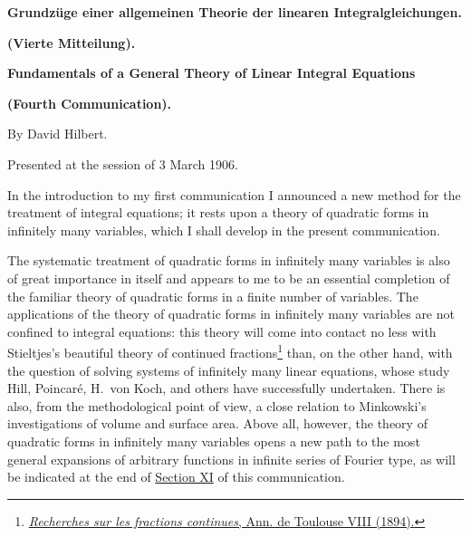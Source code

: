 \documentclass[b5paper,twoside]{article}
\newcommand{\originalpage}[1]{\phantomsection\label{origpage:#1}}
\begin{document}
\thispagestyle{empty}
\begin{center}
  {\LARGE\bfseries Grundz\"uge einer allgemeinen Theorie der linearen
  Integralgleichungen.\par}
  \vspace{0.35\baselineskip}
  {\Large\bfseries (Vierte Mitteilung).\par}
  \vspace{0.8\baselineskip}
  {\LARGE\bfseries Fundamentals of a General Theory of Linear Integral
  Equations\par}
  \vspace{0.35\baselineskip}
  {\Large\bfseries (Fourth Communication).\par}
  \vspace{0.8\baselineskip}
  {\large By David Hilbert.\par}
  \vspace{0.35\baselineskip}
  {Presented at the session of 3 March 1906.\par}
\end{center}
\vspace{0.6\baselineskip}

\originalpage{157}
In the introduction to my first communication I announced a new method for
the treatment of integral equations; it rests upon a theory of quadratic
forms in infinitely many variables, which I shall develop in the present
communication.

The systematic treatment of quadratic forms in infinitely many variables is
also of great importance in itself and appears to me to be an essential
completion of the familiar theory of quadratic forms in a finite number of
variables.  The applications of the theory of quadratic forms in infinitely
many variables are not confined to integral equations: this theory will come
into contact no less with Stieltjes's beautiful theory of continued
fractions\footnote{\hyperref[bib:Stieltjes1894]{\emph{Recherches sur les
fractions continues}, Ann. de Toulouse VIII (1894).}} than, on the other hand, with the
question of solving systems of infinitely many linear equations, whose study
Hill, Poincar\'e, H.~von Koch, and others have successfully undertaken.  There
is also, from the methodological point of view, a close relation to
Minkowski's investigations of volume and surface area.  Above all, however,
the theory of quadratic forms in infinitely many variables
opens\originalpage{158} a new path
to the most general expansions of arbitrary functions in infinite series of
Fourier type, as will be indicated at the end of
\hyperref[sec:XI]{Section XI} of this communication.
\end{document}
